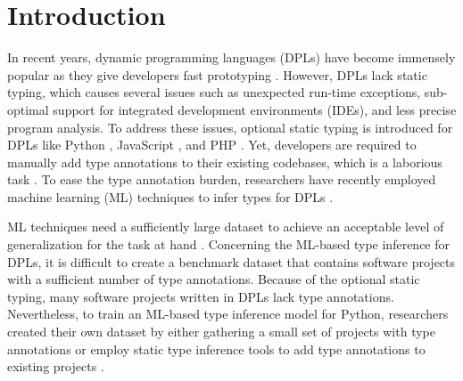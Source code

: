 \documentclass[10pt, conference]{IEEEtran}
\begin{document}
\section{Introduction}
In recent years, dynamic programming languages (DPLs) have become immensely popular as they give developers fast prototyping \cite{ieeespec2019}. However, DPLs lack static typing, which causes several issues such as unexpected run-time exceptions, sub-optimal support for integrated development environments (IDEs), and less precise program analysis. To address these issues, optional static typing is introduced for DPLs like Python \cite{van2014pep}, JavaScript \cite{bierman2014understanding}, and PHP \cite{klingstrom2020type}. Yet, developers are required to manually add type annotations to their existing codebases, which is a laborious task \cite{ore2018assessing}. To ease the type annotation burden, researchers have recently employed machine learning (ML) techniques to infer types for DPLs \cite{malik2019nl2type, pradel2019typewriter, allamanis2020typilus}.

%

ML techniques need a sufficiently large dataset to achieve an acceptable level of generalization for the task at hand \cite{sun2017revisiting}. Concerning the ML-based type inference for DPLs, it is difficult to create a benchmark dataset that contains software projects with a sufficient number of type annotations. Because of the optional static typing, many software projects written in DPLs lack type annotations. Nevertheless, to train an ML-based type inference model for Python, researchers created their own dataset by either gathering a small set of projects with type annotations \cite{pradel2019typewriter} or employ static type inference tools to add type annotations to existing projects \cite{allamanis2020typilus}.
\end{document}
